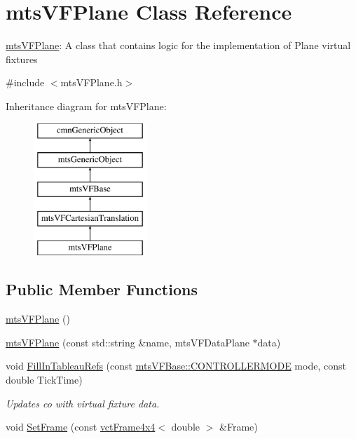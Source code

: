 \hypertarget{classmts_v_f_plane}{\section{mts\-V\-F\-Plane Class Reference}
\label{classmts_v_f_plane}
}


\hyperlink{classmts_v_f_plane}{mts\-V\-F\-Plane}\-: A class that contains logic for the implementation of Plane virtual fixtures  




{\ttfamily \#include $<$mts\-V\-F\-Plane.\-h$>$}

Inheritance diagram for mts\-V\-F\-Plane\-:\begin{figure}[H]
\begin{center}
\leavevmode
\includegraphics[height=5.000000cm]{de/dc6/classmts_v_f_plane}
\end{center}
\end{figure}
\subsection*{Public Member Functions}
\begin{DoxyCompactItemize}
\item 
\hyperlink{classmts_v_f_plane_a052cfafc7f08e6222a439c2b196ff193}{mts\-V\-F\-Plane} ()
\item 
\hyperlink{classmts_v_f_plane_a33c2747719b8174022e5c0865919171e}{mts\-V\-F\-Plane} (const std\-::string \&name, mts\-V\-F\-Data\-Plane $\ast$data)
\item 
void \hyperlink{classmts_v_f_plane_a23097d9359e426edaf5584de27f2a696}{Fill\-In\-Tableau\-Refs} (const \hyperlink{classmts_v_f_base_a742dd08f8b70bafeb746cec14d9ee974}{mts\-V\-F\-Base\-::\-C\-O\-N\-T\-R\-O\-L\-L\-E\-R\-M\-O\-D\-E} mode, const double Tick\-Time)
\begin{DoxyCompactList}\small\item\em Updates co with virtual fixture data. \end{DoxyCompactList}\item 
void \hyperlink{classmts_v_f_plane_ac5c7f2ac79d75c1a1976650ebcb3084b}{Set\-Frame} (const \hyperlink{classvct_frame4x4}{vct\-Frame4x4}$<$ double $>$ \&Frame)
\end{DoxyCompactItemize}
